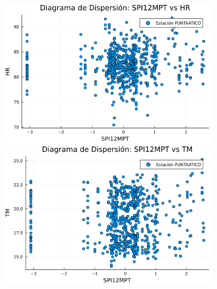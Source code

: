 \begin{figure}[htbp]
\vspace{0.5cm}  %

\begin{minipage}{0.32\textwidth}
    \centering
    \includegraphics[width=\linewidth]{Capitulos/Scaterplot/PUNTAATICO_SPI12MPT_vs_HR.png}
\end{minipage}\hfill
\begin{minipage}{0.32\textwidth}
    \centering
    \includegraphics[width=\linewidth]{Capitulos/Scaterplot/PUNTAATICO_SPI12MPT_vs_TM.png}
\end{minipage}\hfill
\begin{minipage}{0.32\textwidth}
    \centering

\end{minipage}
\end{figure}
